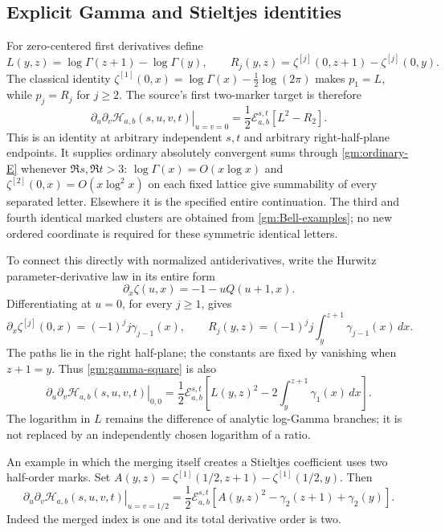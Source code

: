 \documentclass[11pt,a4paper]{article}
\numberwithin{equation}{section}
\theoremstyle{definition}
\theoremstyle{remark}
\begin{document}
\subsection{Explicit Gamma and Stieltjes identities}

For zero-centered first derivatives define
\[
 L(y,z)=\log\Gamma(z+1)-\log\Gamma(y),\qquad
 R_j(y,z)=\zeta^{[j]}(0,z+1)-\zeta^{[j]}(0,y).
\]
The classical identity
\(\zeta^{[1]}(0,x)=\log\Gamma(x)-\tfrac12\log(2\pi)\)
\cite{DLMF} makes \(p_1=L\), while \(p_j=R_j\) for
\(j\ge2\).  The source's first two-marker target is therefore
\begin{equation}\label{gm:gamma-square}
 \boxed{\left.\partial_u\partial_v
       \mathcal H_{a,b}(s,u,v,t)\right|_{u=v=0}
       =\frac12\mathcal E_{a,b}^{s,t}[L^2-R_2].}
\end{equation}
This is an identity at arbitrary independent \(s,t\) and arbitrary
right-half-plane endpoints.  It supplies ordinary absolutely convergent
sums through \eqref{gm:ordinary-E} whenever \(\Re s,\Re t>3\):
\(\log\Gamma(x)=O(x\log x)\) and
\(\zeta^{[2]}(0,x)=O(x\log^2x)\) on each fixed lattice give
summability of every separated letter.  Elsewhere it is the specified
entire continuation.  The third and fourth identical marked clusters
are obtained from \eqref{gm:Bell-examples}; no new ordered coordinate
is required for these symmetric identical letters.

To connect this directly with normalized antiderivatives, write the
Hurwitz parameter-derivative law in its entire form
\[
 \partial_x\zeta(u,x)=-1-uQ(u+1,x).
\]
Differentiating at \(u=0\), for every \(j\ge1\), gives
\begin{equation}\label{gm:primitive}
 \partial_x\zeta^{[j]}(0,x)=(-1)^j j\gamma_{j-1}(x),\qquad
 R_j(y,z)=(-1)^j j\int_y^{z+1}\gamma_{j-1}(x)\,dx.
\end{equation}
The paths lie in the right half-plane; the constants are fixed by
vanishing when \(z+1=y\).  Thus \eqref{gm:gamma-square} is also
\begin{equation}\label{gm:gamma-integral}
 \left.\partial_u\partial_v\mathcal H_{a,b}(s,u,v,t)\right|_{0,0}
  =\frac12\mathcal E_{a,b}^{s,t}\!\left[
       L(y,z)^2-2\int_y^{z+1}\gamma_1(x)\,dx\right].
\end{equation}
The logarithm in \(L\) remains the difference of analytic log-Gamma
branches; it is not replaced by an independently chosen logarithm of
a ratio.

An example in which the merging itself creates a Stieltjes coefficient
uses two half-order marks.  Set
\(A(y,z)=\zeta^{[1]}(1/2,z+1)-\zeta^{[1]}(1/2,y)\).
Then
\begin{equation}\label{gm:half-pair}
 \left.\partial_u\partial_v\mathcal H_{a,b}(s,u,v,t)
                                      \right|_{u=v=1/2}
 =\frac12\mathcal E_{a,b}^{s,t}
          [A(y,z)^2-\gamma_2(z+1)+\gamma_2(y)].
\end{equation}
Indeed the merged index is one and its total derivative order is two.
\end{document}
